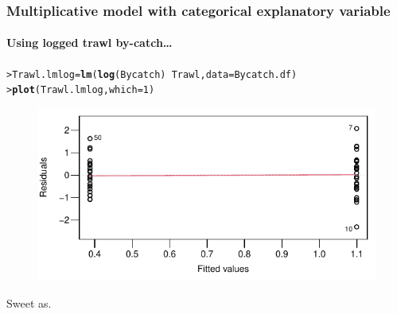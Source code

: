\documentclass{beamer}\usepackage[]{graphicx}\usepackage[]{xcolor}
\makeatletter
\newcommand{\hlnum}[1]{\textcolor[rgb]{0.686,0.059,0.569}{#1}}%
\newcommand{\hlopt}[1]{\textcolor[rgb]{0,0,0}{#1}}%
\newcommand{\hlstd}[1]{\textcolor[rgb]{0.345,0.345,0.345}{#1}}%
\newcommand{\hlkwb}[1]{\textcolor[rgb]{0.69,0.353,0.396}{#1}}%
\newcommand{\hlkwc}[1]{\textcolor[rgb]{0.333,0.667,0.333}{#1}}%
\newcommand{\hlkwd}[1]{\textcolor[rgb]{0.737,0.353,0.396}{\textbf{#1}}}%
\newenvironment{kframe}{%
 \def\at@end@of@kframe{}%
 \ifinner\ifhmode%
  \def\at@end@of@kframe{\end{minipage}}%
  \begin{minipage}{\columnwidth}%
 \fi\fi%
 \def\FrameCommand##1{\hskip\@totalleftmargin \hskip-\fboxsep
 \colorbox{shadecolor}{##1}\hskip-\fboxsep
     \hskip-\linewidth \hskip-\@totalleftmargin \hskip\columnwidth}%
 \MakeFramed {\advance\hsize-\width
   \@totalleftmargin\z@ \linewidth\hsize
   \@setminipage}}%
 {\par\unskip\endMakeFramed%
 \at@end@of@kframe}
\newenvironment{knitrout}{}{} %
\makeatother
\begin{document}
\begin{frame}[fragile]
\frametitle{Multiplicative model with categorical explanatory variable}
\framesubtitle{Using logged trawl by-catch\ldots}

\begin{knitrout}\scriptsize
{}\color{fgcolor}\begin{kframe}
\begin{alltt}
\hlstd{> }\hlstd{Trawl.lmlog}\hlkwb{=}\hlkwd{lm}\hlstd{(}\hlkwd{log}\hlstd{(Bycatch)}\hlopt{~}\hlstd{Trawl,}\hlkwc{data}\hlstd{=Bycatch.df)}
\hlstd{> }\hlkwd{plot}\hlstd{(Trawl.lmlog,}\hlkwc{which}\hlstd{=}\hlnum{1}\hlstd{)}
\end{alltt}
\end{kframe}
\end{knitrout}



\begin{figure}
  \centering
  \includegraphics{figure/RC-H06-057}
\end{figure}

Sweet as.
\end{frame}
\end{document}
